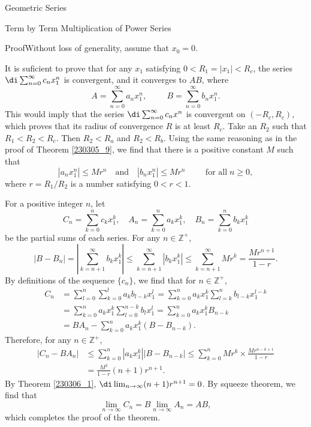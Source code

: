 \begin{example}[label=230305_16]{Geometric Series}
\begin{example}[label=230304_9]{}
\begin{example}{}
\begin{theorem}[label=230306_2]{Term by Term Multiplication of Power Series}
\end{theorem}
\begin{myproof}{Proof}Without loss of generality, assume that   $x_0=0$.  

It is suficient to prove that for any $x_1$ satisfying $0<R_1=|x_1|<R_c$, the series $\di\sum_{n=0}^{\infty}c_nx_1^n$ is convergent, and it converges to $AB$, where
\[A=\sum_{n=0}^{\infty}a_nx_1^n,\hspace{1cm}B=\sum_{n=0}^{\infty}b_nx_1^n.\]
This would imply that the series $\di\sum_{n=0}^{\infty}c_nx^n$ is convergent on $(-R_c, R_c)$, which proves that its radius of convergence $R$ is  at least $R_c$.\bp
Take an $R_2$ such that $R_1<R_2<R_c$. Then $R_2<R_a$ and $R_2<R_b$. Using the same reasoning as in the proof of Theorem \ref{230305_9}, we find that there is a positive constant $M$ such that
\[|a_nx_1^n|\leq Mr^n\quad\text{and}\quad |b_nx_1^n|\leq Mr^n\hspace{1cm}\text{for all}\;n\geq 0,\]
where $r=R_1/R_2$ is a number satisfying $0<r<1$.

For a positive integer $n$, let 
\[C_n =\sum_{k=0}^{n}c_kx_1^k,\quad A_n =\sum_{k=0}^{n}a_kx_1^k,\quad B_n =\sum_{k=0}^{n}b_kx_1^k \]be the partial sums of each series.
For any $n\in\mathbb{Z}^+$, 
\[|B-B_n|=\left|\sum_{k=n+1}^{\infty}b_kx_1^k\right|\leq \sum_{k=n+1}^{\infty}\left|b_kx_1^k\right|\leq\sum_{k=n+1}^{\infty}Mr^{k}=\frac{Mr^{n+1}}{1-r}.\]
By definitions of the sequence $\{c_n\}$, we find that for $n\in\mathbb{Z}^+$,
\begin{align*}
C_n&=\sum_{l=0}^n\sum_{k=0}^la_kb_{l-k}x_1^l=\sum_{k=0}^n a_kx_1^k\sum_{l=k}^n b_{l-k}x_1^{l-k}\\&=\sum_{k=0}^n a_kx_1^k\sum_{l=0}^{n-k} b_{l}x_1^{l}=\sum_{k=0}^na_kx_1^k B_{n-k} \\
&=BA_n -\sum_{k=0}^{n}a_kx_1^k(B-B_{n-k}).
\end{align*} Therefore, for any $n\in\mathbb{Z}^+$,
\begin{align*}
|C_n-BA_n|&\leq\sum_{k=0}^n |a_kx_1^k||B-B_{n-k}|\leq\sum_{k=0}^n Mr^k\times \frac{Mr^{n-k+1}}{1-r}\\
&=\frac{M^2}{1-r}(n+1)r^{n+1}.
\end{align*}By Theorem \ref{230306_1}, $\di \lim_{n\to\infty}(n+1)r^{n+1}=0$. By squeeze theorem, we find that
\[\lim_{n\to\infty}C_n=B\lim_{n\to\infty}A_n=AB,\]which completes the proof of the theorem.
 
\end{myproof}


\end{example}
\end{example}
\end{example}
